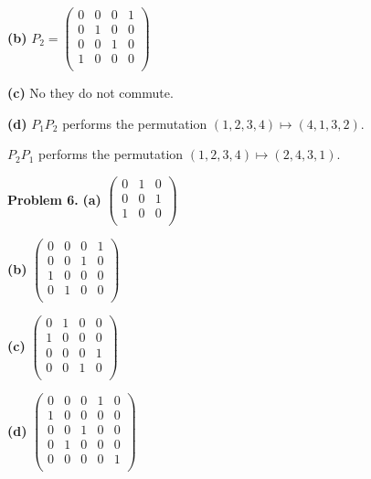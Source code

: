 \documentclass[oneside,12pt]{amsart}
\begin{document}
\bigskip

\textbf{(b)}
$P_2=
\begin{pmatrix}
0 & 0 & 0 & 1\\
0 & 1 & 0 & 0\\
0 & 0 & 1 & 0\\
1 & 0 & 0 & 0\\
\end{pmatrix}
$

\bigskip

\textbf{(c)} No they do not commute.

\bigskip

\textbf{(d)} $P_1 P_2$ performs the permutation $(1,2,3,4) \mapsto (4,1,3,2)$.

\bigskip

$P_2 P_1$ performs the permutation $(1,2,3,4) \mapsto (2,4,3,1)$.

\bigskip

\textbf{Problem 6.}
\textbf{(a)}
$
\begin{pmatrix}
0 & 1 & 0\\
0 & 0 & 1\\
1 & 0 & 0\\
\end{pmatrix}
$

\bigskip

\textbf{(b)}
$
\begin{pmatrix}
0 & 0 & 0 & 1\\
0 & 0 & 1 & 0\\
1 & 0 & 0 & 0\\
0 & 1 & 0 & 0\\
\end{pmatrix}
$

\bigskip

\textbf{(c)}
$
\begin{pmatrix}
0 & 1 & 0 & 0\\
1 & 0 & 0 & 0\\
0 & 0 & 0 & 1\\
0 & 0 & 1 & 0\\
\end{pmatrix}
$

\bigskip

\textbf{(d)}
$
\begin{pmatrix}
0 & 0 & 0 & 1 & 0\\
1 & 0 & 0 & 0 & 0\\
0 & 0 & 1 & 0 & 0\\
0 & 1 & 0 & 0 & 0\\
0 & 0 & 0 & 0 & 1\\
\end{pmatrix}
$
\end{document}
